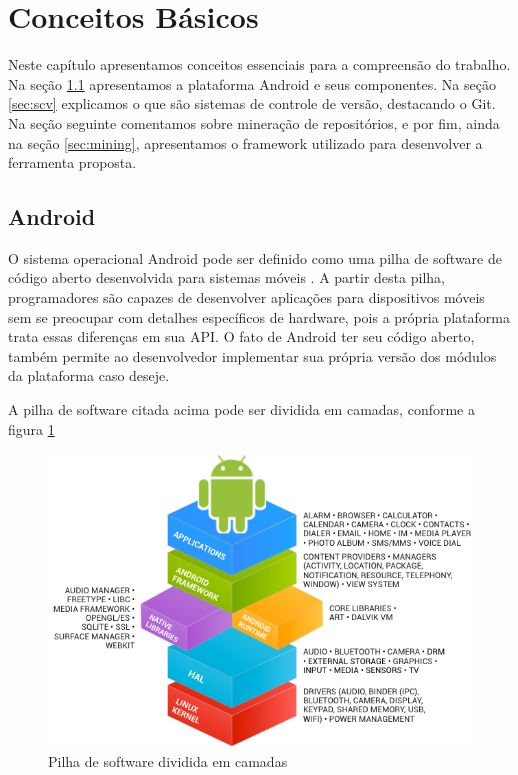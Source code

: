 \documentclass[a4paper,12pt]{article}
\begin{document}

\newpage

\section{Conceitos Básicos}

Neste capítulo apresentamos conceitos essenciais para a compreensão do trabalho. Na seção \ref{sec:android} apresentamos a plataforma Android e seus componentes. Na seção \ref{sec:scv} explicamos o que são sistemas de controle de versão, destacando o Git.  Na seção seguinte comentamos sobre mineração de repositórios, e por fim, ainda na seção \ref{sec:mining}, apresentamos o framework utilizado para desenvolver a ferramenta proposta.

\subsection{Android}%
\label{sec:android}
O sistema operacional Android pode ser definido como uma pilha de software de código aberto desenvolvida para sistemas móveis \cite{androidSource}. A partir desta pilha, programadores são capazes de desenvolver aplicações para dispositivos móveis sem se preocupar com detalhes específicos de hardware, pois a própria plataforma trata essas diferenças em sua API. O fato de Android ter seu código aberto, também permite ao desenvolvedor implementar sua própria versão dos módulos da plataforma caso deseje.

A pilha de software citada acima pode ser dividida em camadas, conforme a figura \ref{fig:androidStack}

\begin{figure}[h]
\centering
\includegraphics[width=0.8\linewidth]{imgs/android_framework_details.png}
\caption{Pilha de software dividida em camadas \cite{androidSource}}
\label{fig:androidStack}
\end{figure}
\end{document}
